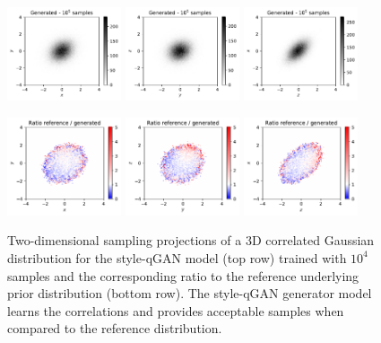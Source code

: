 \documentclass[twocolumn,preprintnumbers,superscriptaddress]{revtex4-2}
\begin{document}
\begin{figure}
  \includegraphics[width=0.3\textwidth]{plots/3Dgaussian_posdef/1-2_FAKE_100k.pdf}%
  \includegraphics[width=0.3\textwidth]{plots/3Dgaussian_posdef/2-3_FAKE_100k.pdf}%
  \includegraphics[width=0.3\textwidth]{plots/3Dgaussian_posdef/3-1_FAKE_100k.pdf}

  \includegraphics[width=0.3\textwidth]{plots/3Dgaussian_posdef/1-2_RATIO_100k.pdf}%
  \includegraphics[width=0.3\textwidth]{plots/3Dgaussian_posdef/2-3_RATIO_100k.pdf}%
  \includegraphics[width=0.3\textwidth]{plots/3Dgaussian_posdef/3-1_RATIO_100k.pdf}

  \caption{\label{fig:3dgauss}Two-dimensional sampling projections of a 3D
  correlated Gaussian distribution for the style-qGAN model (top row) trained with $10^4$ samples
  and the corresponding ratio to the reference underlying prior distribution
  (bottom row). The style-qGAN generator model learns the correlations and provides
  acceptable samples when compared to the reference distribution.}
\end{figure}
\end{document}
